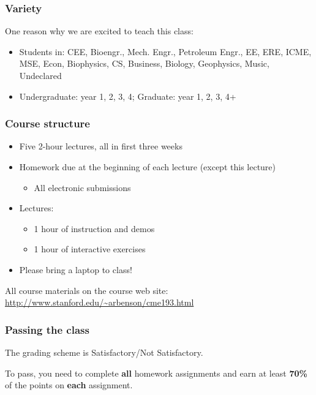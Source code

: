 \documentclass{beamer}
\begin{document}
\begin{frame}
\frametitle{Variety}
One reason why we are excited to teach this class:

\begin{itemize}
\item{Students in: CEE, Bioengr., Mech. Engr., Petroleum Engr., EE, ERE, ICME, MSE, Econ, Biophysics, CS, Business, Biology, Geophysics, Music, Undeclared}
\item{Undergraduate: year 1, 2, 3, 4; Graduate: year 1, 2, 3, 4+}
\end{itemize}

\end{frame}

\begin{frame}
\frametitle{Course structure}

\begin{itemize}
\setlength{\itemsep}{0.2in}
\item{
Five 2-hour lectures, all in first three weeks
}

\item{
Homework due at the beginning of each lecture (except this lecture)
\begin{itemize}
\setlength{\itemsep}{0.05in}
\item{All electronic submissions}
\end{itemize}
}

\item{
Lectures:
\begin{itemize}
\setlength{\itemsep}{0.05in}
\item{1 hour of instruction and demos}
\item{1 hour of interactive exercises}
\end{itemize}
}

\item{
Please bring a laptop to class!
}
\end{itemize}

\vspace{0.2in}

All course materials on the course web site: \url{http://www.stanford.edu/~arbenson/cme193.html}

\end{frame}


\begin{frame}
\frametitle{Passing the class}

The grading scheme is Satisfactory/Not Satisfactory.

\vspace{0.2in}

To pass, you need to complete \textbf{all} homework assignments and earn at least \textbf{70\%} of the points on \textbf{each} assignment.

\end{frame}
\end{document}
